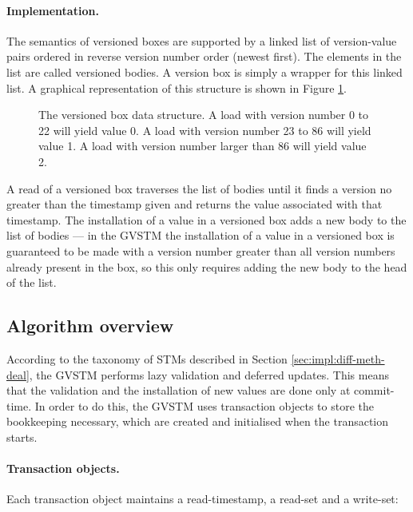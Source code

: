 \documentclass[12pt,a4paper,oneside,openright]{report}
\newcommand{\mycaption}[2]{\caption[#1]{#1 #2}}
\begin{document}
\paragraph{Implementation.} The semantics of versioned boxes are
supported by a linked list of version-value pairs ordered in reverse
version number order (newest first). The elements in the list are
called versioned bodies. A version box is simply a wrapper for this
linked list. A graphical representation of this structure is shown in
Figure \ref{fig:box-and-bodies}.

\begin{figure}[hb]
  \centering
  \mycaption{The versioned box data structure.}{A load with version
    number 0 to 22 will yield value 0. A load with version number 23
    to 86 will yield value 1. A load with version number larger than
    86 will yield value 2.}
  \label{fig:box-and-bodies}
\end{figure}
A read of a versioned box traverses the list of bodies until it finds
a version no greater than the timestamp given and returns the value
associated with that timestamp. The installation of a value in a
versioned box adds a new body to the list of bodies --- in the GVSTM
the installation of a value in a versioned box is guaranteed to be
made with a version number greater than all version numbers already
present in the box, so this only requires adding the new body to the
head of the list.

\subsection{Algorithm overview}
\label{sec:algorithm-overview}

According to the taxonomy of STMs described in Section
\ref{sec:impl:diff-meth-deal}, the GVSTM performs lazy validation and
deferred updates. This means that the validation and the installation
of new values are done only at commit-time. In order to do this, the
GVSTM uses transaction objects to store the bookkeeping necessary,
which are created and initialised when the transaction starts.

\paragraph{Transaction objects.} Each transaction object maintains a
read-timestamp, a read-set and a write-set:
\end{document}
